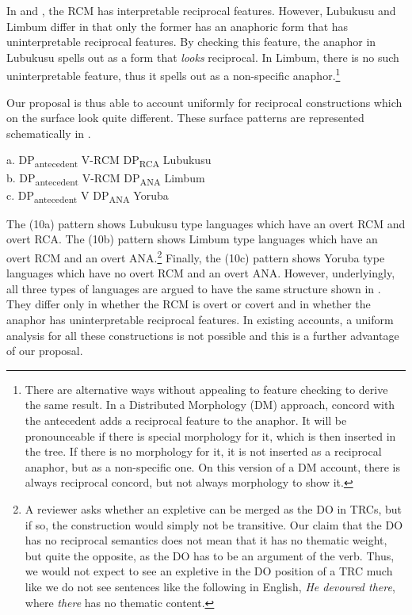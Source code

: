 \documentclass[output=paper]{langsci/langscibook}
\begin{document}
In  and , the RCM has interpretable reciprocal features. However, Lubukusu and Limbum differ in that only the former has an anaphoric form that has uninterpretable reciprocal features. By checking this feature, the anaphor in Lubukusu spells out as a form that \textit{looks} reciprocal. In Limbum, there is no such uninterpretable feature, thus it spells out as a non-specific anaphor.\footnote{There are alternative ways without appealing to feature checking to derive the same result. In a Distributed Morphology (DM) approach, concord with the antecedent adds a reciprocal feature to the anaphor. It will be pronounceable if there is special morphology for it, which is then inserted in the tree. If there is no morphology for it, it is not inserted as a reciprocal anaphor, but as a non-specific one. On this version of a DM account, there is always reciprocal concord, but not always morphology to show it.} 

Our proposal is thus able to account uniformly for reciprocal constructions which on the surface look quite different. These surface patterns are represented schematically in .


\ea\label{ex:safir:10}
\glll a. DP\-\textsubscript{antecedent}      V-RCM  DP\textsubscript{RCA}  {} {} {} {} {Lubukusu} \\
b. DP\-\textsubscript{antecedent}      V-RCM  DP\textsubscript{ANA}  {} {} {} {} {Limbum} \\
c. DP\-\textsubscript{antecedent}      V    DP\textsubscript{ANA}  {} {} {} { } {Yoruba}   \\
\z

The (10a) pattern shows Lubukusu type languages which have an overt RCM and overt RCA. The (10b) pattern shows Limbum type languages which have an overt RCM and an overt ANA.\footnote{A reviewer asks whether an expletive can be merged as the DO in TRCs, but if so, the construction would simply not be transitive. Our claim that the DO has no reciprocal semantics does not mean that it has no thematic weight, but quite the opposite, as the DO has to be an argument of the verb. Thus, we would not expect to see an expletive in the DO position of a TRC much like we do not see sentences like the following in English, \textit{He devoured there}, where \textit{there} has no thematic content.}   Finally, the (10c) pattern shows Yoruba type languages which have no overt RCM and an overt ANA. However, underlyingly, all three types of languages are argued to have the same structure shown in . They differ only in whether the RCM is overt or covert and in whether the anaphor has uninterpretable reciprocal features.  In existing accounts, a uniform analysis for all these constructions is not possible and this is a further advantage of our proposal. 
\end{document}
